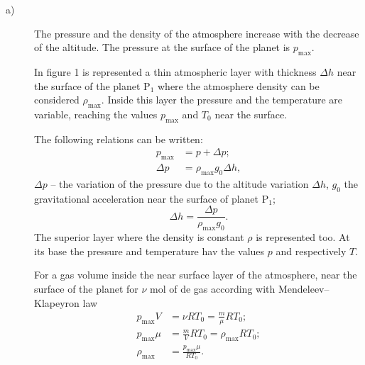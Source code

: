 
\begin{description}
\item[a)]
The pressure and the density of the atmosphere increase with the decrease of the altitude.
The pressure at the surface of the planet is $p_{\max}$.

In figure 1 is represented a thin atmospheric layer with thickness $\Delta h$ near the surface
of the planet P$_1$ where the atmosphere density can be considered $\rho_{\max}$. Inside this
layer the pressure and the temperature are variable, reaching the values $p_{\max}$ and $T_0$
near the surface.

The following relations can be written:
\begin{align*}
p_{\max} &= p + \Delta p;\\
\Delta p &= \rho_{\max}g_0\Delta h,
\end{align*}
$\Delta p$ -- the variation of the pressure due to the altitude variation $\Delta h$, $g_0$
the gravitational acceleration near the surface of planet P$_1$;
\[
\Delta h = \frac{\Delta p}{\rho_{\max}g_0}.
\]
The superior layer where the density is constant $\rho$ is represented too. At its base the
pressure and temperature hav the values $p$ and respectively $T$. %

For a gas volume inside the near surface layer of the atmosphere, near the surface of the
planet for $\nu$ mol of de gas according with Mendeleev--Klapeyron law %
\begin{align*}
p_{\max}V &= \nu RT_0 = \frac{m}{\mu}RT_0;\\
p_{\max}\mu &= \frac{m}{V}RT_0 = \rho_{\max}RT_0;\\
\rho_{\max} &= \frac{p_{\max}\mu}{RT_0}.
\end{align*}


\end{description}
